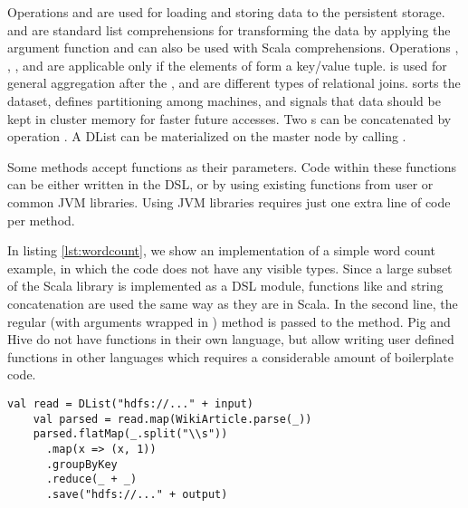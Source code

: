 Operations  and  are used for loading and storing data to the persistent storage.  and  are standard list comprehensions for transforming the data by applying the argument function and can also be used with Scala  comprehensions. Operations , , ,  and  are applicable only if the elements of  form a key/value tuple.  is used for general aggregation after the ,  and  are different types of relational joins.  sorts the dataset,  defines partitioning among machines, and  signals that data should be kept in cluster memory for faster future accesses. Two s can be concatenated by operation \code{++}. A DList can be materialized on the master node by calling .

Some methods accept functions as their parameters. Code within these functions can be either written in the \tool DSL, or by using existing functions from user or common JVM libraries. Using JVM libraries requires just one extra line of code per method.  

In listing \ref{lst:wordcount}, we show an implementation of a simple word count example, in which the code does not have any visible  types. Since a large subset of the Scala library is implemented as a DSL module, functions like  and string concatenation are used the same way as they are in Scala. In the second line, the regular (with arguments wrapped in ) method  is passed to the  method. Pig and Hive do not have functions in their own language, but allow writing user defined functions in other languages which requires a considerable amount of boilerplate code.

\begin{lstlisting}[name=code, caption=Example of word count program where type inference removes the need to declare any \scode{Rep} types., captionpos=b, label=lst:wordcount, float=t]
    val read = DList("hdfs://..." + input)
    val parsed = read.map(WikiArticle.parse(_))
    parsed.flatMap(_.split("\\s"))
      .map(x => (x, 1))
      .groupByKey
      .reduce(_ + _)
      .save("hdfs://..." + output)
\end{lstlisting}

